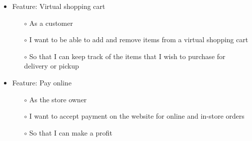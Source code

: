 \documentclass{scrreprt}
\begin{document}
\begin{itemize}
	\item Feature: Virtual shopping cart
	\begin{itemize}
		\item[$\circ$]As a customer
		\item[$\circ$]I want to be able to add and remove items from a virtual shopping cart
		\item[$\circ$]So that I can keep track of the items that I wish to purchase for delivery or pickup
	\end{itemize}
\end{itemize}

\begin{itemize}
	\item Feature: Pay online
	\begin{itemize}
		\item[$\circ$]As the store owner
		\item[$\circ$]I want to accept payment on the website for online and in-store orders
		\item[$\circ$]So that I can make a profit
	\end{itemize}
\end{itemize}

\end{document}
